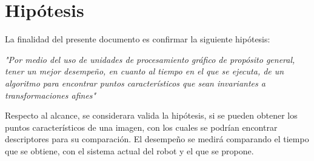 \section{Hipótesis} 

La finalidad del presente documento es  confirmar la siguiente hipótesis:

\begin{center}
\textit{"Por medio del uso de unidades de procesamiento gráfico de propósito general, tener un mejor desempeño, en cuanto al tiempo en el que se ejecuta, de un algoritmo para encontrar puntos característicos que sean invariantes a transformaciones afines"}

\end{center}

Respecto al alcance, se considerara valida la hipótesis, si se pueden obtener los puntos característicos de una imagen, con los cuales se podrían encontrar descriptores para su comparación. El desempeño se medirá comparando el tiempo que se obtiene, con el sistema actual del robot y el que se propone.  \\



